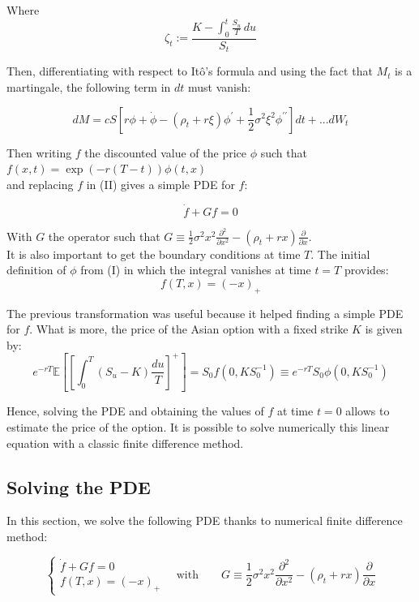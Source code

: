 \documentclass{article}
\begin{document}
Where
\[
	\zeta_{t} := \frac{K-\int_{0}^{t} \frac{S_{u}}{T}\,du}{S_{t}}
\]

Then, differentiating with respect to It\^o's formula and using the fact that $M_{t}$ is a martingale,
the following term in $dt$ must vanish:

\begin{equation}
	dM={c}{{S\left[r\phi+\dot{\phi}-\left(\rho_{t}+r\xi\right)\phi^{\prime}
	+\frac{1}{2}\sigma^{2}\xi^{2}\phi^{\prime\prime}\right]}}dt +...dW_t
	\tag{II}
\end{equation}

Then writing $f$ the discounted value of the price $\phi$ such that $f(x,t)=\exp(-r(T-t))\phi(t, x)$ \\
and replacing $f$ in (II) gives a simple PDE for $f$:

\begin{equation}
	\dot{f} + Gf=0
	\tag{PDE}
\end{equation}

With $G$ the operator such that
$G\equiv\frac{1}{2}\sigma^{2}x^{2}\frac{\partial^{2}}{\partial x^{2}}-(\rho_{t}+r x)\frac{\partial}{\partial x}$.
\\

It is also important to get the boundary conditions at time $T$. The initial definition of $\phi$ from (I)
in which the integral vanishes at time $t=T$ provides:
\[
	f(T,x)=(-x)_{+} 
\]

The previous transformation was useful because it helped finding a simple PDE for $f$.
What is more, the price of the Asian option with a fixed strike $K$ is given by:
\[
 	e^{-r T} \mathbb E \left[ \left[ \int_{0}^{T} \left( S_{u}-K \right) \frac{du}{T} \right]^{+} \right]
	=S_{0} f \left( 0, K S_{0}^{-1} \right) \equiv e^{-r T} S_{0} \phi \left( 0, K S_{0}^{-1} \right)
\]

Hence, solving the PDE and obtaining the values of $f$ at time $t=0$ allows to estimate the price of the option.
It is possible to solve numerically this linear equation with a classic finite difference method. 

\subsection{Solving the PDE}

In this section, we solve the following PDE thanks to numerical finite difference method:

\[
	\begin{cases}
		\dot{f} + Gf = 0 \\
		f(T,x)=(-x)_{+}
	\end{cases}
	\quad \text{with} \qquad
	G \equiv \frac{1}{2}\sigma^{2}x^{2}\frac{\partial^{2}}{\partial x^{2}}-(\rho_{t}+r x)\frac{\partial}{\partial x}
\]
\end{document}

